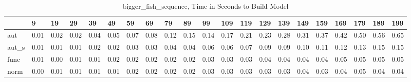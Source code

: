 \begin{table}
\centering
\caption{bigger_fish_sequence, Time in Seconds to Build Model}
\label{bigger_fish_sequence_model_time}
\begin{tabular}{lllllllllllllllllllll}
\toprule
{} &     9 &    19 &    29 &    39 &    49 &    59 &    69 &    79 &    89 &    99 &   109 &   119 &   129 &   139 &   149 &   159 &   169 &   179 &   189 &   199 \\
\midrule
aut   &  0.01 &  0.02 &  0.02 &  0.04 &  0.05 &  0.07 &  0.08 &  0.12 &  0.15 &  0.14 &  0.17 &  0.21 &  0.23 &  0.28 &  0.31 &  0.37 &  0.42 &  0.50 &  0.56 &  0.65 \\
aut\_s &  0.01 &  0.01 &  0.01 &  0.02 &  0.02 &  0.03 &  0.03 &  0.04 &  0.04 &  0.06 &  0.06 &  0.07 &  0.09 &  0.09 &  0.10 &  0.11 &  0.12 &  0.13 &  0.15 &  0.15 \\
func  &  0.01 &  0.00 &  0.01 &  0.01 &  0.02 &  0.02 &  0.02 &  0.02 &  0.02 &  0.03 &  0.03 &  0.03 &  0.04 &  0.04 &  0.04 &  0.04 &  0.05 &  0.05 &  0.05 &  0.05 \\
norm  &  0.00 &  0.01 &  0.01 &  0.01 &  0.01 &  0.02 &  0.02 &  0.02 &  0.02 &  0.03 &  0.03 &  0.03 &  0.03 &  0.03 &  0.04 &  0.03 &  0.04 &  0.05 &  0.04 &  0.04 \\
\bottomrule
\end{tabular}
\end{table}
